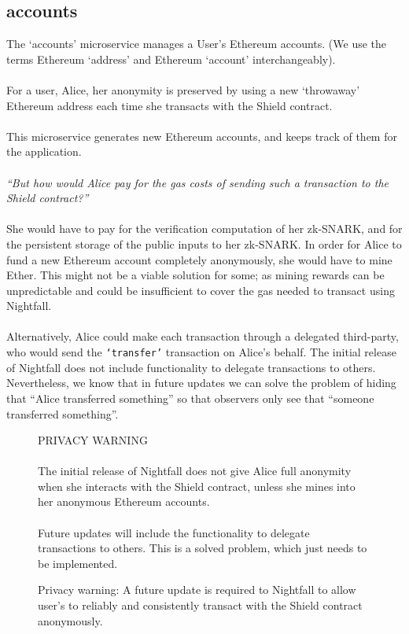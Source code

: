\documentclass{article}
\begin{document}
\subsection{accounts}
\label{sec:accounts}

The `accounts' microservice manages a User's Ethereum accounts. (We use the terms Ethereum `address' and Ethereum `account' interchangeably).\\
\\
For a user, Alice, her anonymity is preserved by using a new `throwaway' Ethereum address each time she transacts with the Shield contract.\\
\\
This microservice generates new Ethereum accounts, and keeps track of them for the application.\\
\\
\textit{``But how would Alice pay for the gas costs of sending such a transaction to the Shield contract?''}\\
\\
She would have to pay for the verification computation of her zk-SNARK, and for the persistent storage of the public inputs to her zk-SNARK. In order for Alice to fund a new Ethereum account completely anonymously, she would have to mine Ether. This might not be a viable solution for some; as mining rewards can be unpredictable and could be insufficient to cover the gas needed to transact using Nightfall.\\
\\
Alternatively, Alice could make each transaction through a delegated third-party, who would send the \texttt{`transfer'} transaction on Alice's behalf. The initial release of Nightfall does not include functionality to delegate transactions to others. Nevertheless, we know that in future updates we can solve the problem of hiding that ``Alice transferred something'' so that observers only see that ``someone transferred something''.

\begin{figure}[H]
  \begin{center}
    \begin{mdframed}[backgroundcolor=verylightred]
      \noindent
      PRIVACY WARNING\\
      \\
      The initial release of Nightfall does not give Alice full anonymity when she interacts with the Shield contract, unless she mines into her anonymous Ethereum accounts.\\
      \\
      Future updates will include the functionality to delegate transactions to others. This is a solved problem, which just needs to be implemented.
    \end{mdframed}
  \end{center}
  \caption{Privacy warning: A future update is required to Nightfall to allow user's to reliably and consistently transact with the Shield contract anonymously.}
\end{figure}
\end{document}
